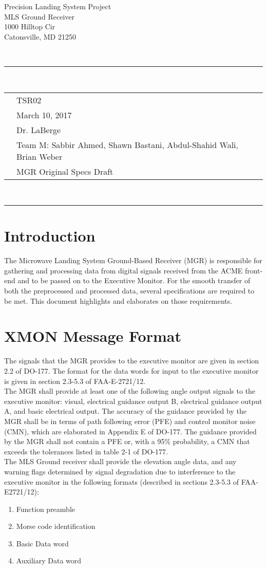 \documentclass[11pt]{article}
\newcommand{\header}[5]{
	\begin{centering}
		\parbox{6.8in}{
		\begin{flushright}
		\begin{spacing}{.8}{
		\fontfamily{cmss}{\large{\textbf{#1}}\\}}
		\small{
			#2\\
			#3\\
			#4\\
			#5}\\
		\end{spacing}
		\end{flushright}
		\vspace{-7.5mm}
		}\\
		\rule{\textwidth}{0.5pt}\\
		\vspace{-4mm}
	\end{centering}
}
\newcommand{\documentinfo}[5]{
	\begin{centering}
		\parbox{6.8in}{
		\begin{spacing}{1}
			\begin{flushleft}
				\begin{tabular}{l l}
					\fontfamily{cmss}{\textbf{DOC \#: }} & #1 \\
					\fontfamily{cmss}{\textbf{DATE: }} & #2 \\
					\fontfamily{cmss}{\textbf{TO: }} & #3 \\
					\fontfamily{cmss}{\textbf{FROM: }} & #4 \\
					\fontfamily{cmss}{\textbf{SUBJECT: }} & #5 \\
				\end{tabular}\\
				\rule{\textwidth}{1pt}
			\end{flushleft}
		\end{spacing}
		}
	\end{centering}
}
\begin{document}
\header{CMPE349}{Precision Landing System Project}{MLS Ground Receiver}{1000 Hilltop Cir}{Catonsville, MD 21250}

\documentinfo{TSR02}{March 10, 2017}{Dr. LaBerge}{Team M: Sabbir Ahmed, Shawn Bastani, Abdul-Shahid Wali, Brian Weber}{MGR Original Specs Draft}

	\section{Introduction}
	The Microwave Landing System Ground-Based Receiver (MGR) is responsible for gathering and processing data from digital signals received from the ACME front-end and to be passed on to the Executive Monitor. For the smooth transfer of both the preprocessed and processed data, several specifications are required to be met. This document highlights and elaborates on those requirements.

	\section{XMON Message Format}
	The signals that the MGR provides to the executive monitor are given in section 2.2 of DO-177. The format for the data words for input to the executive monitor is given in section 2.3-5.3 of FAA-E-2721/12.\\
	The MGR shall provide at least one of the following angle output signals to the executive monitor: visual, electrical guidance output B, electrical guidance output A, and basic electrical output. The accuracy of the guidance provided by the MGR shall be in terms of path following error (PFE) and control monitor noise (CMN), which are elaborated in Appendix E of DO-177. The guidance provided by the MGR shall not contain a PFE or, with a 95\% probability, a CMN that exceeds the tolerances listed in table 2-1 of DO-177.\\
	The MLS Ground receiver shall provide the elevation angle data, and any warning flags determined by signal degradation due to interference to the executive monitor in the following formats (described in sections 2.3-5.3 of FAA-E2721/12):
		\begin{enumerate}

			\item Function preamble

			\item Morse code identification

			\item Basic Data word

			\item Auxiliary Data word

		\end{enumerate}
\end{document}
